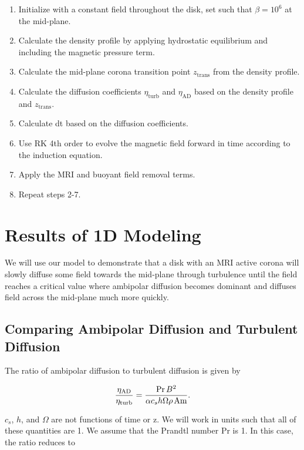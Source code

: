\begin{enumerate}
\item{Initialize with a constant field throughout the disk, set such that $\beta=10^6$ at the mid-plane. }
\item{Calculate the density profile by applying hydrostatic equilibrium and including the magnetic pressure term.}
\item{Calculate the mid-plane corona transition point $z_{\text{trans}}$ from the density profile. }
\item{Calculate the diffusion coefficients $\eta_{\text{turb}}$ and $\eta_{\text{AD}}$ based on the density profile and $z_{\text{trans}}$.}
\item{Calculate dt based on the diffusion coefficients.}
\item{Use RK 4th order to evolve the magnetic field forward in time according to the induction equation.}
\item{Apply the MRI and buoyant field removal terms.}
\item{Repeat steps 2-7.}
\end{enumerate}





\section{Results of 1D Modeling}
We will use our model to demonstrate that a disk with an MRI active corona will slowly diffuse some field towards the mid-plane through turbulence until the field reaches a critical value where ambipolar diffusion becomes dominant and diffuses field across the mid-plane much more quickly.


\subsection{Comparing Ambipolar Diffusion and Turbulent Diffusion}
The ratio of ambipolar diffusion to turbulent diffusion is given by

\begin{equation}
\frac{\eta_{\text{AD}}}{\eta_{\text{turb}}} = \frac{\text{Pr} \hspace{0.5mm} B^2}{\alpha c_s h \Omega \rho \hspace{0.5mm} \text{Am}}.
\end{equation}

\noindent $c_s$, $h$, and $\Omega$ are not functions of time or z.  We will work in units such that all of these quantities are 1.  We assume that the Prandtl number Pr is 1.  In this case, the ratio reduces to

